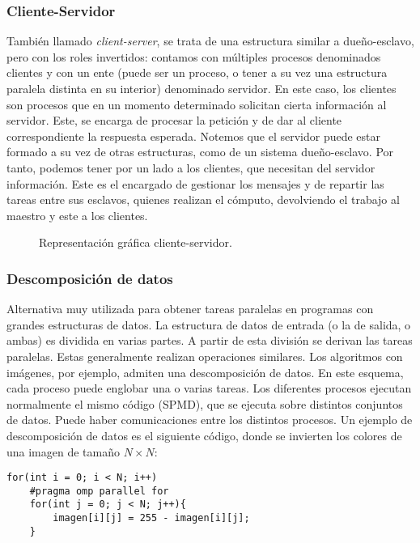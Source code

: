 \subsubsection{Cliente-Servidor} 
También llamado \emph{client-server}, se trata de una estructura similar a dueño-esclavo, pero con los roles invertidos: contamos con múltiples procesos denominados clientes y con un ente (puede ser un proceso, o tener a su vez una estructura paralela distinta en su interior) denominado servidor. En este caso, los clientes son procesos que en un momento determinado solicitan cierta información al servidor. Este, se encarga de procesar la petición y de dar al cliente correspondiente la respuesta esperada. 
Notemos que el servidor puede estar formado a su vez de otras estructuras, como de un sistema dueño-esclavo. Por tanto, podemos tener por un lado a los clientes, que necesitan del servidor información. Este es el encargado de gestionar los mensajes y de repartir las tareas entre sus esclavos, quienes realizan el cómputo, devolviendo el trabajo al maestro y este a los clientes. 
\begin{figure}[H]
\centering
{}
\caption{Representación gráfica cliente-servidor.}
\label{graph:cliente_servidor}
\end{figure}

\subsubsection{Descomposición de datos} 
Alternativa muy utilizada para obtener tareas paralelas en programas con grandes estructuras de datos. La estructura de datos de entrada (o la de salida, o ambas) es dividida en varias partes. A partir de esta división se derivan las tareas paralelas. Estas generalmente realizan operaciones similares. Los algoritmos con imágenes, por ejemplo, admiten una descomposición de datos.
En este esquema, cada proceso puede englobar una o varias tareas. Los diferentes procesos ejecutan normalmente el mismo código (SPMD), que se ejecuta sobre distintos conjuntos de datos. Puede haber comunicaciones entre los distintos procesos.
Un ejemplo de descomposición de datos es el siguiente código, donde se invierten los colores de una imagen de tamaño $N\times N$:
    \begin{verbatim}
for(int i = 0; i < N; i++)
    #pragma omp parallel for
    for(int j = 0; j < N; j++){
        imagen[i][j] = 255 - imagen[i][j];
    }
    \end{verbatim}

